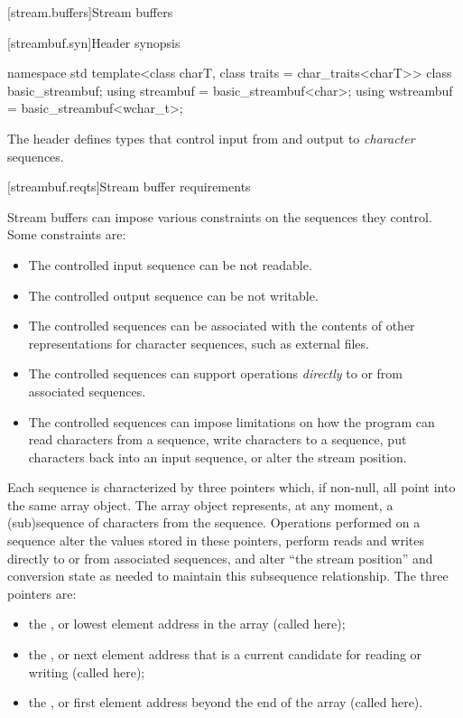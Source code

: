 [stream.buffers]{Stream buffers}

[streambuf.syn]{Header  synopsis}
%

%
%
%
%
\begin{codeblock}
namespace std {
  template<class charT, class traits = char_traits<charT>>
    class basic_streambuf;
  using streambuf  = basic_streambuf<char>;
  using wstreambuf = basic_streambuf<wchar_t>;
}
\end{codeblock}

\pnum
The header
defines types that control input from and output to
\textit{character}
sequences.

[streambuf.reqts]{Stream buffer requirements}

\pnum
Stream buffers can impose various constraints on the sequences they control.
Some constraints are:
\begin{itemize}
\item
The controlled input sequence can be not readable.
\item
The controlled output sequence can be not writable.
\item
The controlled sequences can be associated with the contents of other
representations for character sequences, such as external files.
\item
The controlled sequences can support operations
\textit{directly}
to or from associated sequences.
\item
The controlled sequences can impose limitations on how the program can
read characters from a sequence,
write characters to a sequence,
put characters back into an input sequence, or
alter the stream position.
\end{itemize}

\pnum
Each sequence is characterized by three pointers which, if non-null,
all point into the same
array object.
The array object represents, at any moment,
a (sub)sequence of characters from the sequence.
Operations performed on a sequence alter the values stored in these pointers,
perform reads and writes directly to or from associated sequences, and
alter ``the stream position'' and conversion state as needed to
maintain this subsequence relationship.
The three pointers are:
\begin{itemize}
\item
the
,
or lowest element address in the array
(called  here);
\item
the
,
or next element address that is a current
candidate for reading or writing (called  here);
\item
the
,
or first element address beyond the end of
the array (called  here).
\end{itemize}

